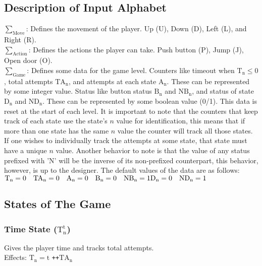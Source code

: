 \documentclass[10pt,twocolumn]{article}
\begin{document}
\subsection*{Description of Input Alphabet}
\noindent
$\sum_{\text{Move}}$: Defines the movement of the player. Up (U), Down (D), Left (L), and Right (R). \\

\noindent
$\sum_{\text{Action}}$: Defines the actions the player can take. Push button (P), Jump (J), Open door (O). \\

\noindent
$\sum_{\text{Game}}$: Defines some data for the game level. Counters like timeout when $\text{T}_{\text{n}} \leq 0$, total attempts $\text{TA}_{\text{n}}$, and attempts at each state $\text{A}_{\text{n}}$. These can be represented by some integer value. Status like button status $\text{B}_{\text{n}}$ and $\text{NB}_{\text{n}}$, and status of state $\text{D}_{\text{n}}$ and $\text{ND}_{\text{n}}$. These can be represented by some boolean value (0/1). This data is reset at the start of each level. It is important to note that the counters that keep track of each state use the state's $n$ value for identification, this means that if more than one state has the same $n$ value the counter will track all those states. If one wishes to individually track the attempts at some state, that state must have a unique $n$ value. Another behavior to note is that the value of any status prefixed with 'N' will be the inverse of its non-prefixed counterpart, this behavior, however, is up to the designer. The default values of the data are as follows: \\

\noindent
\begin{math}
  \text{T}_{\text{n}} =  0 \quad \text{TA}_{\text{n}} = 0 \quad \text{A}_{\text{n}} =  0 \quad
  \text{B}_{\text{n}} = 0 \quad \text{NB}_{\text{n}} = 1 \\ \text{D}_{\text{n}} = 0 \quad
  \text{ND}_{\text{n}} = 1
\end{math}

\subsection*{States of The Game}
\subsubsection*{Time State ($\text{T}_{\text{n}}^{\text{t}}$)}
Gives the player time and tracks total attempts. \\
Effects: $\text{T}_{\text{n}} = \text{t}$ \quad \texttt{++}$\text{TA}_{\text{n}}$
\end{document}
